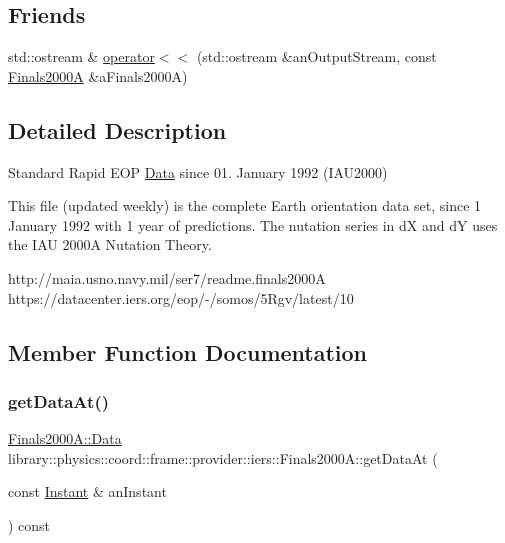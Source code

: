 \subsection*{Friends}
\begin{DoxyCompactItemize}
\item 
std\+::ostream \& \hyperlink{classlibrary_1_1physics_1_1coord_1_1frame_1_1provider_1_1iers_1_1_finals2000_a_ade92763eb1cb719a4a499af1beb72b43}{operator$<$$<$} (std\+::ostream \&an\+Output\+Stream, const \hyperlink{classlibrary_1_1physics_1_1coord_1_1frame_1_1provider_1_1iers_1_1_finals2000_a}{Finals2000A} \&a\+Finals2000A)
\end{DoxyCompactItemize}


\subsection{Detailed Description}
Standard Rapid E\+OP \hyperlink{structlibrary_1_1physics_1_1coord_1_1frame_1_1provider_1_1iers_1_1_finals2000_a_1_1_data}{Data} since 01. January 1992 (I\+A\+U2000) 

This file (updated weekly) is the complete Earth orientation data set, since 1 January 1992 with 1 year of predictions. The nutation series in dX and dY uses the I\+AU 2000A Nutation Theory.

http\+://maia.usno.\+navy.\+mil/ser7/readme.finals2000A https\+://datacenter.iers.\+org/eop/-\//somos/5\+Rgv/latest/10 

\subsection{Member Function Documentation}
\mbox{\label{classlibrary_1_1physics_1_1coord_1_1frame_1_1provider_1_1iers_1_1_finals2000_a_a5e7b1a165152fd3ccf0bbfdc859dd3f5}} 
\subsubsection{\texorpdfstring{get\+Data\+At()}{getDataAt()}}
{\footnotesize\ttfamily \hyperlink{structlibrary_1_1physics_1_1coord_1_1frame_1_1provider_1_1iers_1_1_finals2000_a_1_1_data}{Finals2000\+A\+::\+Data} library\+::physics\+::coord\+::frame\+::provider\+::iers\+::\+Finals2000\+A\+::get\+Data\+At (\begin{DoxyParamCaption}\item[{const \hyperlink{classlibrary_1_1physics_1_1time_1_1_instant}{Instant} \&}]{an\+Instant }\end{DoxyParamCaption}) const}

